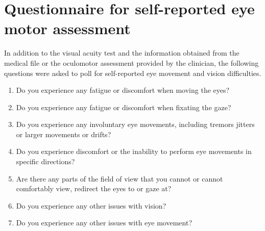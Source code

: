 \section{Questionnaire for self-reported eye motor assessment}
\label{app:oculomotor-questions}

In addition to the visual acuity test and the information obtained from the medical
file or the oculomotor assessment provided by the clinician, the following questions
were asked to poll for self-reported eye movement and vision difficulties.
\begin{enumerate}
	\item Do you experience any fatigue or discomfort when moving the eyes?
	\item Do you experience any fatigue or discomfort when fixating the gaze?
	\item Do you experience any involuntary eye movements, including tremors
	      jitters or larger movements or drifts?
	\item Do you experience discomfort or the inability to perform  eye movements
	      in specific directions?
	\item Are there any parts of the field of view that you cannot or cannot
	      comfortably view, redirect the eyes to or gaze at?
	\item Do you experience any other issues with vision?
	\item Do you experience any other issues with eye movement?
\end{enumerate}
